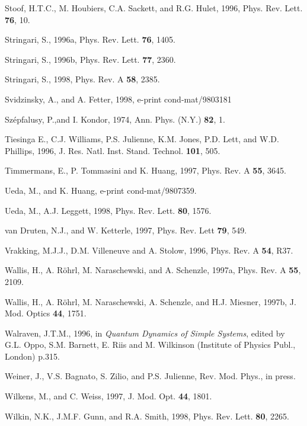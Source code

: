 \begin{references}
 Stoof, H.T.C., M. Houbiers, C.A. Sackett, and
R.G. Hulet, 1996, Phys. Rev. Lett. {\bf 76}, 10.

 Stringari, S., 1996a, Phys. Rev. Lett. {\bf 76},
1405.

 Stringari, S., 1996b, Phys. Rev. Lett. {\bf 77},
2360.

  Stringari, S., 1998, Phys. Rev. A {\bf 58}, 2385.

 Svidzinsky, A., and A. Fetter, 1998, e-print
cond-mat/9803181

 Sz\'{e}pfalusy,  P.,and I. Kondor, 1974, Ann.
Phys. (N.Y.) {\bf 82}, 1.

   Tiesinga E., C.J. Williams, P.S. Julienne, K.M.
Jones, P.D. Lett, and W.D. Phillips, 1996, J. Res. Natl. Inst. Stand.
Technol. {\bf 101}, 505.

 Timmermans, E., P. Tommasini and K. Huang, 1997,
Phys. Rev. A {\bf 55}, 3645.

    Ueda, M., and K. Huang, e-print cond-mat/9807359.

       Ueda, M., A.J. Leggett, 1998, Phys. Rev. Lett.
{\bf 80}, 1576.

  van Druten, N.J., and W. Ketterle, 1997, Phys.
Rev. Lett {\bf 79}, 549.

   Vrakking, M.J.J., D.M. Villeneuve and A. Stolow,
1996, Phys. Rev. A {\bf 54}, R37.

    Wallis, H., A. R\"ohrl, M. Naraschewski, and A.
Schenzle, 1997a, Phys. Rev. A {\bf 55}, 2109.

    Wallis, H., A. R\"ohrl, M. Naraschewski, A.
Schenzle, and H.J. Miesner, 1997b, J. Mod. Optics {\bf 44}, 1751.

  Walraven, J.T.M., 1996, in {\it Quantum Dynamics
of Simple Systems}, edited by G.L. Oppo, S.M. Barnett, E. Riis and
M. Wilkinson (Institute of Physics Publ., London) p.315.

     Weiner, J., V.S. Bagnato, S. Zilio, and P.S.
Julienne, Rev. Mod. Phys., in press.

      Wilkens, M., and C. Weiss, 1997, J. Mod. Opt.
{\bf 44}, 1801. 

       Wilkin, N.K., J.M.F. Gunn, and R.A. Smith, 1998, 
Phys. Rev. Lett. {\bf 80}, 2265. 


\end{references}
